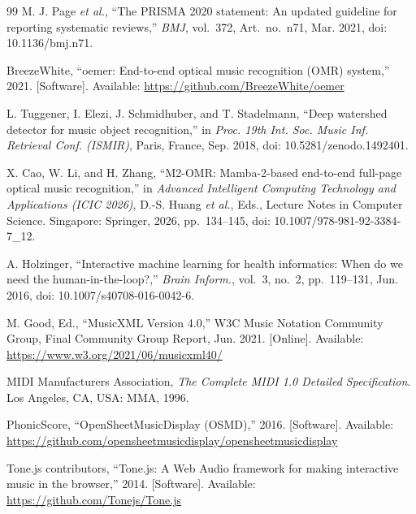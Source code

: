 \documentclass[conference]{IEEEtran}
\begin{document}
\begin{thebibliography}{99}
M. J. Page \emph{et al.}, ``The PRISMA 2020 statement: An updated
guideline for reporting systematic reviews,'' \emph{BMJ}, vol.~372,
Art.\ no.\ n71, Mar. 2021, doi: 10.1136/bmj.n71. %

BreezeWhite, ``oemer: End-to-end optical music recognition (OMR) system,''
2021. [Software]. Available: \url{https://github.com/BreezeWhite/oemer} %

L. Tuggener, I. Elezi, J. Schmidhuber, and T. Stadelmann, ``Deep watershed
detector for music object recognition,'' in \emph{Proc. 19th Int. Soc. Music
Inf. Retrieval Conf. (ISMIR)}, Paris, France, Sep. 2018,
doi: 10.5281/zenodo.1492401. %

X. Cao, W. Li, and H. Zhang, ``M2-OMR: Mamba-2-based end-to-end full-page
optical music recognition,'' in \emph{Advanced Intelligent Computing
Technology and Applications (ICIC 2026)}, D.-S. Huang \emph{et al.}, Eds.,
Lecture Notes in Computer Science. Singapore: Springer, 2026, pp.~134--145,
doi: 10.1007/978-981-92-3384-7\_12. %

A. Holzinger, ``Interactive machine learning for health informatics: When do
we need the human-in-the-loop?,'' \emph{Brain Inform.}, vol.~3, no.~2,
pp.~119--131, Jun. 2016, doi: 10.1007/s40708-016-0042-6. %

M. Good, Ed., ``MusicXML Version 4.0,'' W3C Music Notation Community Group,
Final Community Group Report, Jun. 2021. [Online]. Available:
\url{https://www.w3.org/2021/06/musicxml40/} %

MIDI Manufacturers Association, \emph{The Complete MIDI 1.0 Detailed
Specification}. Los Angeles, CA, USA: MMA, 1996. %

PhonicScore, ``OpenSheetMusicDisplay (OSMD),'' 2016. [Software]. Available:
\url{https://github.com/opensheetmusicdisplay/opensheetmusicdisplay} %

Tone.js contributors, ``Tone.js: A Web Audio framework for making
interactive music in the browser,'' 2014. [Software]. Available:
\url{https://github.com/Tonejs/Tone.js} %


\end{thebibliography}
\end{document}
